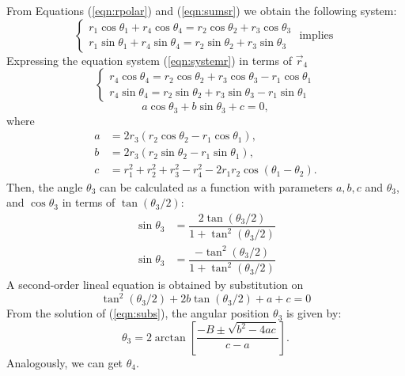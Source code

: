 \documentclass[12pt,letterpape]{article}
\begin{document}
From Equations (\ref{eqn:rpolar}) and  (\ref{eqn:sumsr}) we obtain the following system:
\begin{equation}
	\begin{cases}	
	 	r_1\cos\theta_1 + r_4\cos\theta_4 = r_2\cos\theta_2 + r_3\cos\theta_3 \\
	 	r_1\sin\theta_1 + r_4\sin\theta_4 = r_2\sin\theta_2 + r_3\sin\theta_3 
	\end{cases}
	\text{ implies } 
	\label{eqn:systemr}
\end{equation}
% 
Expressing the equation system (\ref{eqn:systemr}) in terms of $\vec{r}_4$
% 
\begin{equation}
	\begin{cases}	
	 	r_4\cos\theta_4 = r_2\cos\theta_2 + r_3\cos\theta_3 - r_1\cos\theta_1\\
	 	r_4\sin\theta_4 = r_2\sin\theta_2 + r_3\sin\theta_3 - r_1\sin\theta_1
	\end{cases}
	\label{eqn:systemr4}
\end{equation}
% 
% 
\begin{equation}
	a \cos \theta_3 + b\sin\theta_3 + c = 0,
\end{equation}
% 
where
% 
\begin{align*}
	a &= 2r_3 ( r_2\cos\theta_2 - r_1\cos\theta_1 ),\\
	b &= 2r_3 ( r_2\sin\theta_2 - r_1\sin\theta_1 ),\\
	c &= r_1^2 + r_2^2 + r_3^2 - r_4^2 - 2r_1 r_2 \cos( \theta_1 - \theta_2 ).
\end{align*}
% 
Then, the angle $\theta_3$ can be calculated as a function with parameters $a, b, c$
and $\theta_3$, and $\cos\theta_3$ in terms of $\tan (\theta_3 / 2)$:
%
\begin{align}
 	\sin \theta_3 &= \dfrac{2\tan(\theta_3 / 2)}{1 + \tan^2(\theta_3 / 2)}\\
 	\sin \theta_3 &= \dfrac{ - \tan^2(\theta_3 / 2)}{1 + \tan^2(\theta_3 / 2)}
\end{align}
%
A second-order lineal equation is obtained by substitution on
\begin{equation}
	[c - a]\tan^2(\theta_3 / 2) + 2b\tan(\theta_3 / 2) + a + c = 0
	\label{eqn:subs}
\end{equation}
% 
From the solution of (\ref{eqn:subs}), the angular position $\theta_3$ is given by:
\begin{equation}
	\theta_3 = 2\arctan \left[ \dfrac{-B\pm \sqrt{b^2 - 4ac} }{c-a} \right].
	\label{eqn:theta3}
\end{equation}
% 
Analogously, we can get $\theta_4$.
\end{document}
